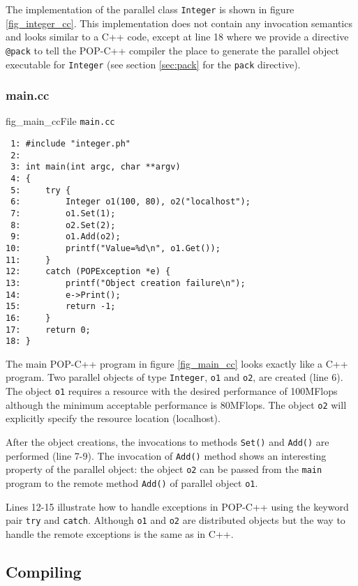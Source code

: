 The implementation of the parallel class \texttt{Integer} is shown in
figure \ref{fig_integer_cc}. This implementation does not contain any
invocation semantics and looks similar to a C++ code, except at line 18
where we provide a directive \texttt{@pack} to tell the POP-C++ compiler
the place to generate the parallel object executable for
\texttt{Integer} (see section \ref{sec:pack} for the \texttt{pack} directive).


\subsubsection{main.cc}
\begin{figura}{fig_main_cc}{File \texttt{main.cc}}%
\vspace{-4mm}%
\begin{verbatim}
 1: #include "integer.ph"
 2:
 3: int main(int argc, char **argv)
 4: {
 5:     try {
 6:         Integer o1(100, 80), o2("localhost");
 7:         o1.Set(1);
 8:         o2.Set(2);
 9:         o1.Add(o2);
10:         printf("Value=%d\n", o1.Get());
11:     }
12:     catch (POPException *e) {
13:         printf("Object creation failure\n");
14:         e->Print();
15:         return -1;
16:     }
17:     return 0;
18: }
\end{verbatim}
\end{figura}


The main POP-C++ program in figure \ref{fig_main_cc} looks exactly like a
C++ program. Two parallel objects of type \texttt{Integer}, \texttt{o1}
and \texttt{o2}, are created (line 6). The object \texttt{o1} requires a
resource with the desired performance of 100MFlops although the minimum
acceptable performance is 80MFlops. The object \texttt{o2} will
explicitly specify the resource location (localhost). 

After the object
creations, the invocations to methods \texttt{Set()} and \texttt{Add()}
are performed (line 7-9). The invocation of \texttt{Add()} method shows
an interesting property of the parallel object: the object \texttt{o2}
can be passed from the \texttt{main} program to the remote method
\texttt{Add()} of parallel object \texttt{o1}. 

Lines 12-15 illustrate
how to handle exceptions in POP-C++ using the keyword pair \texttt{try}
and \texttt{catch}. Although \texttt{o1} and \texttt{o2} are distributed
objects but the way to handle the remote exceptions is the same as in
C++.

\subsection{Compiling}

